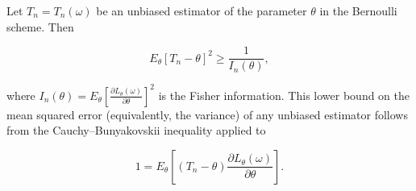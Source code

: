 Let $T_n = T_n(\omega)$ be an unbiased estimator of the parameter $\theta$ in the Bernoulli scheme. Then

$$E_\theta [T_n - \theta]^2 \geq \frac{1}{I_n(\theta)},$$

where $I_n(\theta) = E_\theta \left[ \frac{\partial L_\theta(\omega)}{\partial \theta} \right]^2$ is the Fisher information. This lower bound on the mean squared error (equivalently, the variance) of any unbiased estimator follows from the Cauchy–Bunyakovskii inequality applied to

$$1 = E_\theta \left[ (T_n - \theta) \frac{\partial L_\theta(\omega)}{\partial \theta} \right].$$
